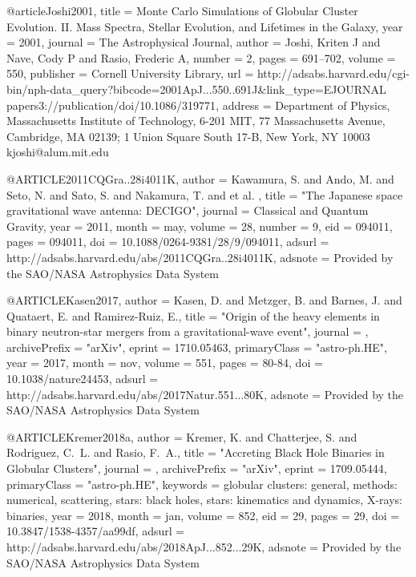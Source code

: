 \documentclass[twocolumn,tighten]{aastex63}
\begin{document}
{{{{{@article{Joshi2001,
    title = {{Monte Carlo Simulations of Globular Cluster Evolution. II. Mass Spectra, Stellar Evolution, and Lifetimes in the Galaxy}},
    year = {2001},
    journal = {The Astrophysical Journal},
    author = {Joshi, Kriten J and Nave, Cody P and Rasio, Frederic A},
    number = {2},
    pages = {691--702},
    volume = {550},
    publisher = {Cornell University Library},
    url = {http://adsabs.harvard.edu/cgi-bin/nph-data_query?bibcode=2001ApJ...550..691J&link_type=EJOURNAL papers3://publication/doi/10.1086/319771},
    address = {Department of Physics, Massachusetts Institute of Technology, 6-201 MIT, 77 Massachusetts Avenue, Cambridge, MA 02139; 1 Union Square South 17-B, New York, NY 10003 kjoshi@alum.mit.edu}
}

@ARTICLE{2011CQGra..28i4011K,
   author = {{Kawamura}, S. and {Ando}, M. and {Seto}, N. and {Sato}, S. and 
	{Nakamura}, T. and et al. 
	},
    title = "{The Japanese space gravitational wave antenna: DECIGO}",
  journal = {Classical and Quantum Gravity},
     year = 2011,
    month = may,
   volume = 28,
   number = 9,
      eid = {094011},
    pages = {094011},
      doi = {10.1088/0264-9381/28/9/094011},
   adsurl = {http://adsabs.harvard.edu/abs/2011CQGra..28i4011K},
  adsnote = {Provided by the SAO/NASA Astrophysics Data System}
}

@ARTICLE{Kasen2017,
   author = {{Kasen}, D. and {Metzger}, B. and {Barnes}, J. and {Quataert}, E. and 
	{Ramirez-Ruiz}, E.},
    title = "{Origin of the heavy elements in binary neutron-star mergers from a gravitational-wave event}",
  journal = {\nat},
archivePrefix = "arXiv",
   eprint = {1710.05463},
 primaryClass = "astro-ph.HE",
     year = 2017,
    month = nov,
   volume = 551,
    pages = {80-84},
      doi = {10.1038/nature24453},
   adsurl = {http://adsabs.harvard.edu/abs/2017Natur.551...80K},
  adsnote = {Provided by the SAO/NASA Astrophysics Data System}
}

@ARTICLE{Kremer2018a,
   author = {{Kremer}, K. and {Chatterjee}, S. and {Rodriguez}, C.~L. and 
	{Rasio}, F.~A.},
    title = "{Accreting Black Hole Binaries in Globular Clusters}",
  journal = {\apj},
archivePrefix = "arXiv",
   eprint = {1709.05444},
 primaryClass = "astro-ph.HE",
 keywords = {globular clusters: general, methods: numerical, scattering, stars: black holes, stars: kinematics and dynamics, X-rays: binaries},
     year = 2018,
    month = jan,
   volume = 852,
      eid = {29},
    pages = {29},
      doi = {10.3847/1538-4357/aa99df},
   adsurl = {http://adsabs.harvard.edu/abs/2018ApJ...852...29K},
  adsnote = {Provided by the SAO/NASA Astrophysics Data System}
}

}}}}}
\end{document}
